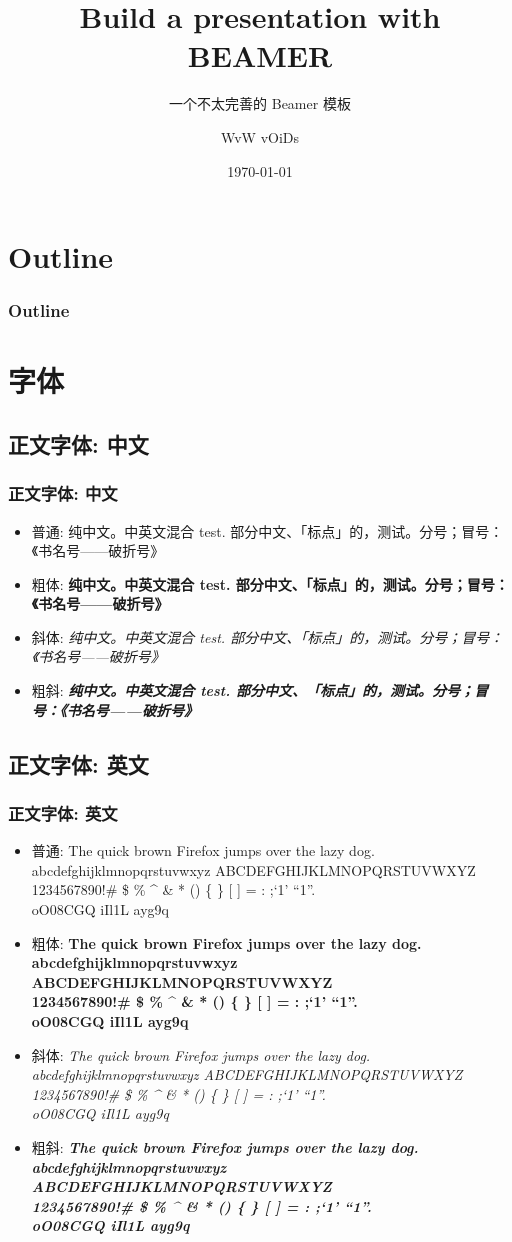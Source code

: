 \documentclass[
aspectratio=169,%
]{beamer}
\title{Build a presentation with BEAMER}
\subtitle{一个不太完善的 Beamer 模板}
\author{WvW vOiDs}
\institute{Your Institute}
\date{\today}
\makeatletter
\newcommand{\chinesetestcontent}{纯中文。中英文混合 test. 部分中文、「标点」的，测试。分号；冒号：《书名号——破折号》}
\newcommand{\englishtestcontent}{The quick brown Firefox jumps over the lazy dog.\\abcdefghijklmnopqrstuvwxyz ABCDEFGHIJKLMNOPQRSTUVWXYZ\\1234567890!\@ \# \$ \% \^{} \& * () \textasciigrave \{ \} [ ] = : ;`1' ``1''.\\oO08CGQ iIl1L ayg9q}
\makeatother
\begin{document}



\section*{Outline}

\begin{frame}\frametitle{Outline}
    \tableofcontents
\end{frame}


\section{字体}
\subsection{正文字体: 中文}

\begin{frame}\frametitle{正文字体: 中文}
    \begin{itemize}
        \item 普通: \chinesetestcontent
        \item 粗体: \textbf{\chinesetestcontent}
        \item 斜体: \textit{\chinesetestcontent}
        \item 粗斜: \textbf{\textit{\chinesetestcontent}}
    \end{itemize}
\end{frame}
\subsection{正文字体: 英文}

\begin{frame}\frametitle{正文字体: 英文}
    \begin{itemize}
        \item 普通: \englishtestcontent
        \item 粗体: \textbf{\englishtestcontent}
        \item 斜体: \textit{\englishtestcontent}
    \end{itemize}
\end{frame}
\begin{frame}
    \begin{itemize}
        \item 粗斜: \textbf{\textit{\englishtestcontent}}
    \end{itemize}
\end{frame}
\end{document}
